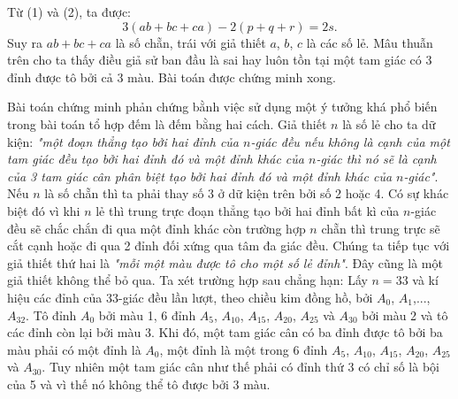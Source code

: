 \begin{bt}
{		Từ (1) và (2), ta được: $$3(ab+bc+ca)-2(p+q+r)=2s.$$
		Suy ra $ab+bc+ca$ là số chẵn, trái với giả thiết $a$, $b$, $c$ là các số lẻ.
		Mâu thuẫn trên cho ta thấy điều giả sử ban đầu là sai hay luôn tồn tại một tam giác có 3 đỉnh được tô bởi cả 3 màu. Bài toán được chứng minh xong.
		\begin{nx}
			Bài toán chứng minh phản chứng bằnh việc sử dụng một ý tưởng khá phổ biến trong bài toán tổ hợp đếm là đếm bằng hai cách.
			Giả thiết $n$ là số lẻ cho ta dữ kiện: \textit{"một đoạn thẳng tạo bởi hai đỉnh của $n$-giác đều nếu không là cạnh của một tam giác đều tạo bởi hai đỉnh đó và một đỉnh khác của $n$-giác thì nó sẽ là cạnh của 3 tam giác cân phân biệt tạo bởi hai đỉnh đó và một đỉnh khác của $n$-giác"}. Nếu $n$ là số chẵn thì ta phải thay số 3 ở dữ kiện trên bởi số 2 hoặc 4. Có sự khác biệt đó vì khi $n$ lẻ thì trung trực đoạn thẳng tạo bởi hai đỉnh bất kì của $n$-giác đều sẽ chắc chắn đi qua một đỉnh khác còn trường hợp $n$ chẵn thì trung trực sẽ cắt cạnh hoặc đi qua 2 đỉnh đối xứng qua tâm đa giác đều.
			Chúng ta tiếp tục với giả thiết thứ hai là \textit{"mỗi một màu được tô cho một số lẻ đỉnh"}. Đây cũng là một giả thiết không thể bỏ qua. Ta xét trường hợp sau chẳng hạn:
			Lấy $n=33$ và kí hiệu các đỉnh của 33-giác đều lần lượt, theo chiều kim đồng hồ, bởi $A_0$, $A_1$,..., $A_{32}$. Tô đỉnh $A_0$ bởi màu 1, 6 đỉnh $A_5$, $A_{10}$, $A_{15}$, $A_{20}$, $A_{25}$ và $A_{30}$ bởi màu 2 và tô các đỉnh còn lại bởi màu 3. Khi đó, một tam giác cân có ba đỉnh được tô bởi ba màu phải có một đỉnh là $A_0$, một đỉnh là một trong 6 đỉnh $A_5$, $A_{10}$, $A_{15}$, $A_{20}$, $A_{25}$ và $A_{30}$. Tuy nhiên một tam giác cân như thế phải có đỉnh thứ 3 có chỉ số là bội của 5 và vì thế nó không thể tô được bởi 3 màu. 
	\end{nx}  } 
\end{bt}
